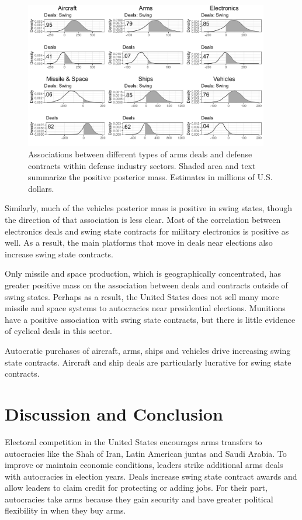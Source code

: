 \documentclass[12pt]{article}
\begin{document}
\begin{figure}[htpb]
	\centering
		\includegraphics[width=0.95\textwidth]{../figures/me-deals-sector.png}
	\caption{Associations between different types of arms deals and defense contracts within defense industry sectors. Shaded area and text summarize the positive posterior mass. Estimates in millions of U.S. dollars.}
	\label{fig:me-deals-sector}
\end{figure}


Similarly, much of the vehicles posterior mass is positive in swing states, though the direction of that association is less clear.
Most of the correlation between electronics deals and swing state contracts for military electronics is positive as well.
As a result, the main platforms that move in deals near elections also increase swing state contracts. 


Only missile and space production, which is geographically concentrated, has greater positive mass on the association between deals and contracts outside of swing states. 
Perhaps as a result, the United States does not sell many more missile and space systems to autocracies near presidential elections. 
Munitions have a positive association with swing state contracts, but there is little evidence of cyclical deals in this sector. 


Autocratic purchases of aircraft, arms, ships and vehicles drive increasing swing state contracts.
Aircraft and ship deals are particularly lucrative for swing state contracts. 



\section{Discussion and Conclusion}


Electoral competition in the United States encourages arms transfers to autocracies like the Shah of Iran, Latin American juntas and Saudi Arabia.
To improve or maintain economic conditions, leaders strike additional arms deals with autocracies in election years.
Deals increase swing state contract awards and allow leaders to claim credit for protecting or adding jobs.
For their part, autocracies take arms because they gain security and have greater political flexibility in when they buy arms. 
\end{document}
